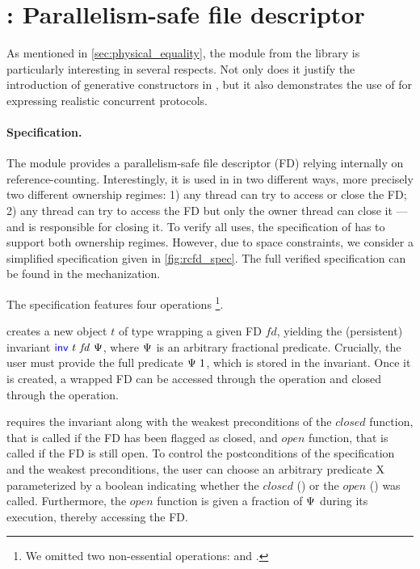 \section{: Parallelism-safe file descriptor}
\label{sec:rcfd}

\newcommand{\inv}{%
  \textcolor{blue}{\textlog{inv}}%
}
\newcommand{\closing}{%
  \textcolor{red}{\textlog{closing}}%
}



As mentioned in \cref{sec:physical_equality}, the  module from the \Eio library is particularly interesting in several respects.
Not only does it justify the introduction of generative constructors in \OCaml, but it also demonstrates the use of \Iris for expressing realistic concurrent protocols.

\paragraph{Specification.}
The  module provides a parallelism-safe file descriptor (FD) relying internally on reference-counting.
Interestingly, it is used in \Eio in two different ways, more precisely two different ownership regimes: 1) any thread can try to access or close the FD; 2) any thread can try to access the FD but only the owner thread can close it --- and is responsible for closing it.
To verify all uses, the specification of  has to support both ownership regimes.
However, due to space constraints, we consider a simplified specification given in \cref{fig:rcfd_spec}.
The full verified specification can be found in the mechanization.

The specification features four operations%
\footnote{
We omitted two non-essential operations:  and .
}.

 creates a new object $t$ of type  wrapping a given FD $\mathit{fd}$, yielding the (persistent) invariant $\inv\ t\ \mathit{fd}\ \iPredTwo$, where $\Psi$ is an arbitrary fractional predicate.
Crucially, the user must provide the full predicate $\Psi\ 1$, which is stored in the invariant.
Once it is created, a wrapped FD can be accessed through the  operation and closed through the  operation.

 requires the invariant along with the weakest preconditions of the $\mathit{closed}$ function, that is called if the FD has been flagged as closed, and $\mathit{open}$ function, that is called if the FD is still open.
To control the postconditions of the specification and the weakest preconditions, the user can choose an arbitrary predicate $\mathrm{X}$ parameterized by a boolean indicating whether the $\mathit{closed}$ () or the $\mathit{open}$ () was called.
Furthermore, the $\mathit{open}$ function is given a fraction of $\Psi$ during its execution, thereby accessing the FD.

